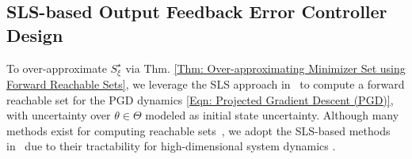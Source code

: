 \documentclass[letterpaper, 10 pt, conference]{ieeeconf}
\newcommand{\?}{\stackrel{?}{=}}
\newcommand{\param}{\theta}
\newcommand{\paramSet}{\Theta}
\newcommand{\var}{\xi}
\newcommand{\varOptSet}{S_\var^\star}
\newcommand{\frank}[1]{{\textcolor[rgb]{0,0,1}{\textsf{[Frank: {#1}]}}}}
\newcommand{\antoine}[1]{{\textcolor[rgb]{1,0,0}{\textsf{[Antoine: {#1}]}}}}
\newcommand{\brendan}[1]{{\textcolor[rgb]{1,0,1}{\textsf{[Brendan: {#1}]}}}}
\begin{document}


\subsection{SLS-based Output Feedback Error Controller Design}
\label{subsec: System-Level Synthesis (SLS)-based Output Feedback Error Controller Design}



To over-approximate
$\varOptSet$
via Thm. \ref{Thm: Over-approximating Minimizer Set using Forward Reachable Sets}, we leverage the SLS approach in~\cite{Leeman2025RobustNonlinearOptimalControlviaSLS, leeman2026vision} to compute a forward reachable set for the PGD dynamics \eqref{Eqn: Projected Gradient Descent (PGD)}, with uncertainty over 
$\param \in \paramSet$ modeled as initial state uncertainty. 
Although many methods exist for computing reachable sets~\cite{Bansal2017HJBReachability, immrax}, we adopt the 
SLS-based methods
in~\cite{Leeman2025RobustNonlinearOptimalControlviaSLS, leeman2026vision} due to their tractability for high-dimensional system dynamics \cite{Leeman2024FastSLS}. 
\end{document}
